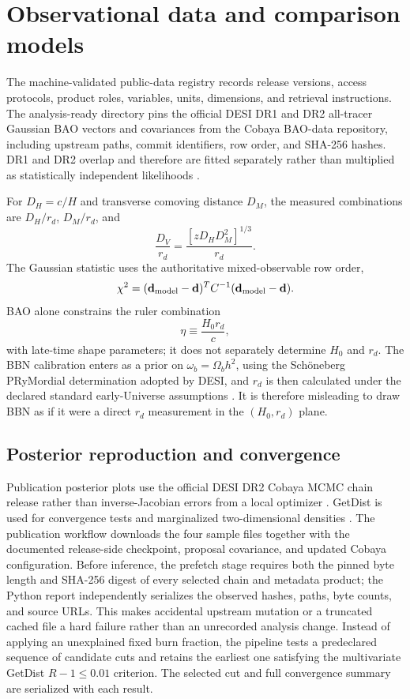 \section{Observational data and comparison models}
The machine-validated public-data registry records release versions, access protocols, product roles, variables, units, dimensions, and retrieval instructions. The analysis-ready directory pins the official DESI DR1 and DR2 all-tracer Gaussian BAO vectors and covariances from the Cobaya BAO-data repository, including upstream paths, commit identifiers, row order, and SHA-256 hashes. DR1 and DR2 overlap and therefore are fitted separately rather than multiplied as statistically independent likelihoods \cite{desi2024iii,desi2024iv,desi2025dr2}.

For $D_H=c/H$ and transverse comoving distance $D_M$, the measured combinations are $D_H/r_d$, $D_M/r_d$, and
\begin{equation}
\frac{D_V}{r_d}=\frac{[zD_HD_M^2]^{1/3}}{r_d}.
\end{equation}
The Gaussian statistic uses the authoritative mixed-observable row order,
\begin{equation}
\chi^2=(\mathbf d_{\rm model}-\mathbf d)^T C^{-1}(\mathbf d_{\rm model}-\mathbf d).
\end{equation}
BAO alone constrains the ruler combination
\begin{equation}
\eta\equiv\frac{H_0r_d}{c},
\end{equation}
with late-time shape parameters; it does not separately determine $H_0$ and $r_d$. The BBN calibration enters as a prior on $\omega_b=\Omega_bh^2$, using the Sch\"oneberg PRyMordial determination adopted by DESI, and $r_d$ is then calculated under the declared standard early-Universe assumptions \cite{schoneberg2024}. It is therefore misleading to draw BBN as if it were a direct $r_d$ measurement in the $(H_0,r_d)$ plane.

\subsection{Posterior reproduction and convergence}
Publication posterior plots use the official DESI DR2 Cobaya MCMC chain release rather than inverse-Jacobian errors from a local optimizer \cite{cobaya,desi2025dr2}. GetDist is used for convergence tests and marginalized two-dimensional densities \cite{getdist}. The publication workflow downloads the four sample files together with the documented release-side checkpoint, proposal covariance, and updated Cobaya configuration. Before inference, the prefetch stage requires both the pinned byte length and SHA-256 digest of every selected chain and metadata product; the Python report independently serializes the observed hashes, paths, byte counts, and source URLs. This makes accidental upstream mutation or a truncated cached file a hard failure rather than an unrecorded analysis change. Instead of applying an unexplained fixed burn fraction, the pipeline tests a predeclared sequence of candidate cuts and retains the earliest one satisfying the multivariate GetDist $R-1\le0.01$ criterion. The selected cut and full convergence summary are serialized with each result.

